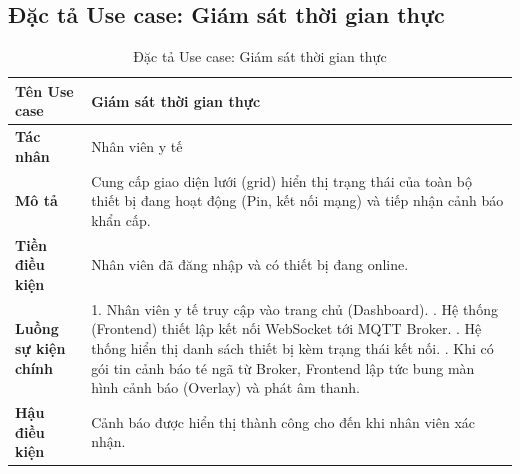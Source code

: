 \documentclass[../DoAn.tex]{subfiles}
\begin{document}
\subsection{Đặc tả Use case: Giám sát thời gian thực}
\begin{table}[H]
    \centering
    \caption{Đặc tả Use case: Giám sát thời gian thực}
    \label{tab:uc_giam_sat}
    \begin{tabular}{|p{4cm}|p{10.5cm}|}
        \hline
        \textbf{Tên Use case} & \textbf{Giám sát thời gian thực} \\ \hline
        \textbf{Tác nhân} & Nhân viên y tế \\ \hline
        \textbf{Mô tả} & Cung cấp giao diện lưới (grid) hiển thị trạng thái của toàn bộ thiết bị đang hoạt động (Pin, kết nối mạng) và tiếp nhận cảnh báo khẩn cấp. \\ \hline
        \textbf{Tiền điều kiện} & Nhân viên đã đăng nhập và có thiết bị đang online. \\ \hline
        \textbf{Luồng sự kiện chính} &
        1. Nhân viên y tế truy cập vào trang chủ (Dashboard). \newline
        2. Hệ thống (Frontend) thiết lập kết nối WebSocket tới MQTT Broker. \newline
        3. Hệ thống hiển thị danh sách thiết bị kèm trạng thái kết nối. \newline
        4. Khi có gói tin cảnh báo té ngã từ Broker, Frontend lập tức bung màn hình cảnh báo (Overlay) và phát âm thanh. \\ \hline
        \textbf{Hậu điều kiện} & Cảnh báo được hiển thị thành công cho đến khi nhân viên xác nhận. \\ \hline
    \end{tabular}
\end{table}
\end{document}

